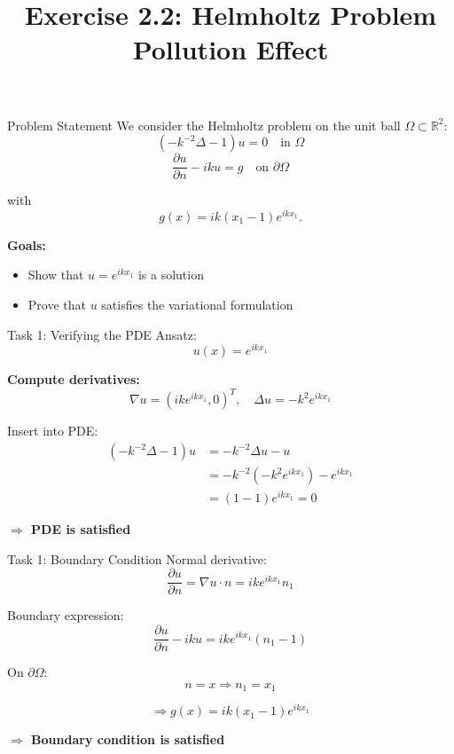 \documentclass{beamer}
\title{Exercise 2.2: Helmholtz Problem \\ Pollution Effect}
\author{}
\date{}
\begin{document}
\frame{\titlepage}

\begin{frame}{Problem Statement}
We consider the Helmholtz problem on the unit ball $\Omega \subset \mathbb{R}^2$:
\[
(-k^{-2}\Delta - 1)u = 0 \quad \text{in } \Omega
\]
\[
\frac{\partial u}{\partial n} - iku = g \quad \text{on } \partial \Omega
\]

with
\[
g(x) = ik(x_1 - 1)e^{ikx_1}.
\]

\bigskip

\textbf{Goals:}
\begin{itemize}
    \item Show that $u = e^{ikx_1}$ is a solution
    \item Prove that $u$ satisfies the variational formulation
\end{itemize}
\end{frame}

\begin{frame}{Task 1: Verifying the PDE}
Ansatz:
\[
u(x) = e^{ikx_1}
\]

\textbf{Compute derivatives:}
\[
\nabla u = (ik e^{ikx_1}, 0)^T, \quad
\Delta u = -k^2 e^{ikx_1}
\]

\bigskip

Insert into PDE:
\begin{align*}
    (-k^{-2}\Delta -1)u
&=-k^{-2}\Delta u-u \\
&= -k^{-2}(-k^2e^{ikx_1}) -e^{ikx_1}\\
&= (1-1)e^{ikx_1} = 0
\end{align*}

\bigskip

\textbf{$\Rightarrow$ PDE is satisfied}
\end{frame}

\begin{frame}{Task 1: Boundary Condition}
Normal derivative:
\[
\frac{\partial u}{\partial n} = \nabla u \cdot n
= ik e^{ikx_1} n_1
\]

Boundary expression:
\[
\frac{\partial u}{\partial n} - iku
= ik e^{ikx_1}(n_1 - 1)
\]

On $\partial \Omega$:
\[
n = x \Rightarrow n_1 = x_1
\]

\bigskip

\[
\Rightarrow g(x) = ik(x_1 -1)e^{ikx_1}
\]

\bigskip

\textbf{$\Rightarrow$ Boundary condition is satisfied}
\end{frame}
\end{document}
